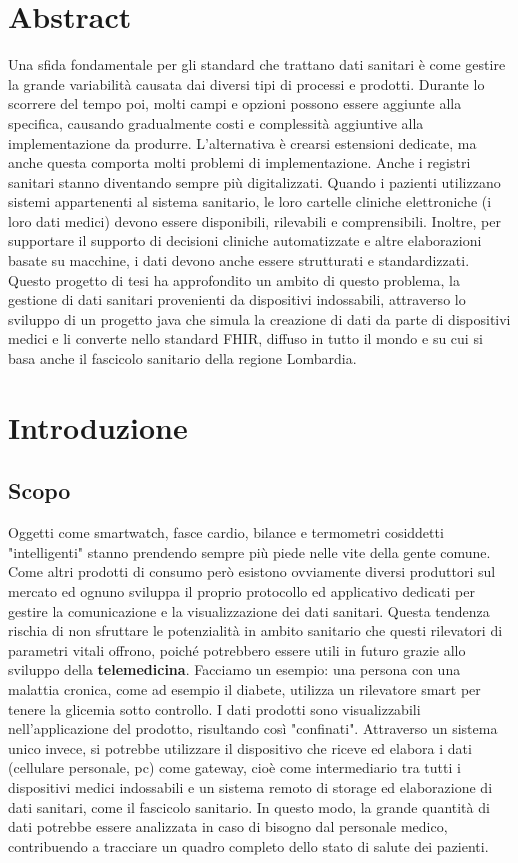 \documentclass[a4paper]{article}
\begin{document}
\section*{Abstract}
Una sfida fondamentale per gli standard che trattano dati sanitari è come gestire la grande variabilità causata dai diversi tipi di processi e prodotti.
Durante lo scorrere del tempo poi, molti campi e opzioni possono essere aggiunte alla specifica, causando gradualmente costi e complessità aggiuntive alla
implementazione da produrre. L'alternativa è crearsi estensioni dedicate, ma anche questa comporta molti problemi di implementazione.
Anche i registri sanitari stanno diventando sempre più digitalizzati. Quando i pazienti utilizzano sistemi appartenenti al sistema sanitario, le loro cartelle cliniche
elettroniche (i loro dati medici) devono essere disponibili, rilevabili e comprensibili. Inoltre, per supportare il supporto di decisioni cliniche automatizzate e altre elaborazioni
basate su macchine, i dati devono anche essere strutturati e standardizzati.
Questo progetto di tesi ha approfondito un ambito di questo problema, la gestione di dati sanitari provenienti da dispositivi indossabili, attraverso lo sviluppo di un progetto java
che simula la creazione di dati da parte di dispositivi medici e li converte nello standard FHIR, diffuso in tutto il mondo e su cui si basa anche il fascicolo sanitario della regione Lombardia. 


\clearpage
\null
\thispagestyle{empty}

\clearpage

\tableofcontents
\newpage
\section{Introduzione}
\subsection{Scopo}
Oggetti come smartwatch, fasce cardio, bilance e termometri cosiddetti "intelligenti" stanno prendendo sempre più piede nelle vite della gente comune.
Come altri prodotti di consumo però esistono ovviamente diversi produttori sul mercato ed ognuno sviluppa il proprio protocollo ed applicativo dedicati
per gestire la comunicazione e la visualizzazione dei dati sanitari.
Questa tendenza rischia di non sfruttare le potenzialità in ambito sanitario che questi rilevatori di parametri vitali offrono, poiché potrebbero essere
utili in futuro grazie allo sviluppo della \textbf{telemedicina}.
Facciamo un esempio: una persona con una malattia cronica, come ad esempio il diabete, utilizza un rilevatore smart per tenere la glicemia sotto controllo.
I dati prodotti sono visualizzabili nell'applicazione del prodotto, risultando così "confinati".
Attraverso un sistema unico invece, si potrebbe utilizzare il dispositivo che riceve ed elabora i dati (cellulare personale, pc) come gateway, cioè come intermediario tra tutti i dispositivi
medici indossabili e un sistema remoto di storage ed elaborazione di dati sanitari, come il fascicolo sanitario.
In questo modo, la grande quantità di dati potrebbe essere analizzata in caso di bisogno dal personale medico, contribuendo a tracciare un quadro completo dello stato di salute dei pazienti.
\end{document}
